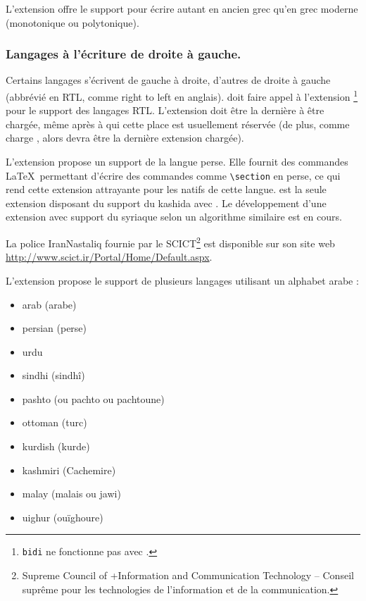 L'extension \cite{xgreek} offre le support
pour écrire autant en ancien grec qu'en grec moderne (monotonique ou
polytonique).

\subsubsection{Langages à l'écriture de droite à gauche.}

Certains langages s'écrivent de gauche à droite, d'autres de droite à
gauche (abbrévié en RTL, comme \og right to left \fg en
anglais).  doit faire appel à l'extension
\cite{bidi}\footnote{\texttt{bidi} ne fonctionne pas avec
  .} pour le support des langages RTL. L'extension
 doit être la dernière à être chargée, même après
 à qui cette place est usuellement réservée (de plus,
comme  charge , alors 
devra être la dernière extension chargée).

L'extension \cite{xepersian} propose un
support de la langue perse. Elle fournit des commandes \LaTeX\
permettant d'écrire des commandes comme \verb|\section| en perse,
ce qui rend cette extension attrayante pour les natifs de cette
langue.  est la seule extension disposant du support du
kashida\index{kashida} avec \hologo{XeLaTeX}. Le développement d'une
extension avec support du syriaque selon un algorithme similaire est
en cours.

La police IranNastaliq fournie par le SCICT\footnote{Supreme Council of
+Information and Communication Technology -- Conseil suprême pour les
technologies de l'information et de la communication. \NdT} est
disponible sur son site web
\url{http://www.scict.ir/Portal/Home/Default.aspx}.

L'extension \cite{arabxetex} propose le support de
plusieurs langages utilisant un alphabet arabe :

\begin{itemize}
\item arab (arabe) 
\item persian (perse) 
\item urdu 
\item sindhi (sindhî) 
\item pashto (ou pachto ou pachtoune) 
\item ottoman (turc) \index{ottoman}\index{Turc}
\item kurdish (kurde) 
\item kashmiri (Cachemire) 
\item malay (malais ou jawi) 
\item uighur (ouïghoure) 
\end{itemize}

